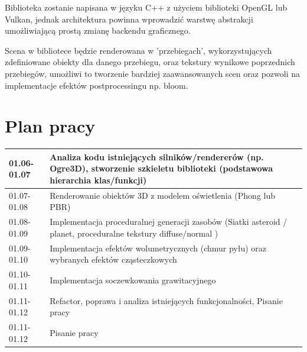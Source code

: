 \documentclass[12pt]{report}
\begin{document}
Biblioteka zostanie napisana w języku C++ z użyciem biblioteki OpenGL lub Vulkan, jednak architektura powinna wprowadzić warstwę abstrakcji umożliwiającą prostą zmianę backendu graficznego.


Scena w bibliotece będzie renderowana w 'przebiegach', wykorzystujących zdefiniowane obiekty dla danego przebiegu, oraz tekstury wynikowe poprzednich przebiegów, umożliwi to tworzenie bardziej zaawansowanych scen oraz pozwoli na implementacje efektów postprocessingu np. bloom.

\section{Plan pracy}

\begin{center}
    \begin{tabular}{ p{8cm} | p{8cm} }
        01.06-01.07 & Analiza kodu istniejących silników/rendererów (np. Ogre3D), stworzenie szkieletu biblioteki (podstawowa hierarchia klas/funkcji)\\ 
 \hline
 01.07-01.08 & Renderowanie obiektów 3D z modelem oświetlenia (Phong lub PBR)\\  
 \hline
 01.08-01.09 & Implementacja proceduralnej generacji zasobów (Siatki asteroid / planet, proceduralne tekstury diffuse/normal ) \\  
 \hline
 01.09-01.10 & Implementacja efektów wolumetrycznych (chmur pyłu) oraz wybranych efektów cząsteczkowych\\  
 \hline
 01.10-01.11 & Implementacja soczewkowania grawitacyjnego \\  
 \hline
 01.11-01.12 & Refactor, poprawa i analiza istniejących funkcjonalności, Pisanie pracy \\  
 \hline
 01.11-01.12 & Pisanie pracy\\  
\end{tabular}
\end{center}

\end{document}
